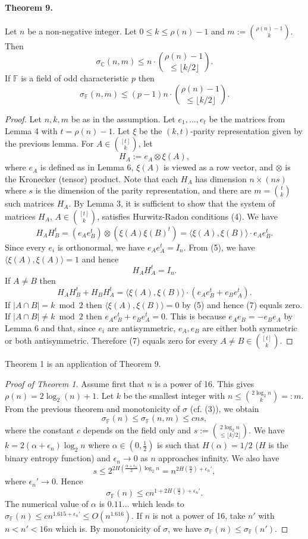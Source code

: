 \paragraph{Theorem 9.} Let $n$ be a non-negative integer. Let $0\le k\le\rho(n)-1$ and $m:=\binom{\rho(n)-1}k$. Then
\[\sigma_{\mathbb C}(n,m)\le n\cdot\binom{\rho(n)-1}{\le\lfloor k/2\rfloor}.\]
If $\mathbb F$ is a field of odd characteristic $p$ then
\[\sigma_{\mathbb F}(n,m)\le(p-1)n\cdot\binom{\rho(n)-1}{\le\lfloor k/2\rfloor}.\]
\begin{proof}
Let $n,k,m$ be as in the assumption. Let $e_1,\ldots,e_t$ be the matrices from Lemma 4 with $t=\rho(n)-1$. Let $\xi$ be the $(k,t)$-parity representation given by the previous lemma. For $A\in\binom{[t]}k$, let
\[H_A:=e_A\otimes\xi(A),\]
where $e_A$ is defined as in Lemma 6, $\xi(A)$ is viewed as a row vector, and $\otimes$ is the Kronecker (tensor) product.
Note that each $H_A$ has dimension $n\times(ns)$ where $s$ is the dimension of the parity representation, and there are $m=\binom tk$ such matrices $H_A$. By Lemma 3, it is sufficient to show that the system of matrices $H_A$, $A\in\binom{[t]}k$, satisfies Hurwitz-Radon conditions (4).
We have
\[H_AH_B^t=(e_Ae_B^t)\otimes(\xi(A)\xi(B)^t)=\langle\xi(A),\xi(B)\rangle\cdot e_Ae_B^t.\]
Since every $e_i$ is orthonormal, we have $e_Ae_A^t=I_n$. From (5), we have $\langle\xi(A),\xi(A)\rangle=1$ and hence
\[H_AH_A^t=I_n.\]
If $A\ne B$ then
\begin{equation}
H_AH_B^t+H_BH_A^t=\langle\xi(A),\xi(B)\rangle\cdot(e_Ae_B^t+e_Be_A^t).\tag{7}
\end{equation}
If $|A\cap B|=k\bmod2$ then $\langle\xi(A),\xi(B)\rangle=0$ by (5) and hence (7) equals zero. If $|A\cap B|\ne k\bmod2$ then $e_Ae_B^t+e_Be_A^t=0$. This is because $e_Ae_B=-e_Be_A$ by Lemma 6 and that, since $e_i$ are antisymmetric, $e_A,e_B$ are either both symmetric or both antisymmetric. Therefore (7) equals zero for every $A\ne B\in\binom{[t]}k$.
\end{proof}
Theorem 1 is an application of Theorem 9.
\begin{proof}[Proof of Theorem 1]
Assume first that $n$ is a power of 16. This gives $\rho(n)=2\log_2(n)+1$. Let $k$ be the smallest integer with $n\le\binom{2\log_2n}k=:m$. From the previous theorem and monotonicity of $\sigma$ (cf. (3)), we obtain
\[\sigma_{\mathbb F}(n)\le\sigma_{\mathbb F}(n,m)\le cns,\]
where the constant $c$ depends on the field only and $s:=\binom{2\log_2n}{\le\lfloor k/2\rfloor}$.
We have $k=2(\alpha+\epsilon_n)\log_2n$ where $\alpha\in(0,\frac12)$ is such that $H(\alpha)=1/2$ ($H$ is the binary entropy function) and $\epsilon_n\to0$ as $n$ approaches infinity. We also have
\[s\le2^{2H(\frac{\alpha+\epsilon_n}{2})\log_2n}=n^{2H(\frac\alpha2)+\epsilon_n'},\]
where $\epsilon_n'\to0$. Hence
\[\sigma_{\mathbb F}(n)\le cn^{1+2H(\frac\alpha2)+\epsilon_n'}.\]
The numerical value of $\alpha$ is $0.11\ldots$ which leads to $\sigma_{\mathbb F}(n)\le cn^{1.615+\epsilon_n'}\le O(n^{1.616})$.
If $n$ is not a power of 16, take $n'$ with $n<n'<16n$ which is. By monotonicity of $\sigma$, we have $\sigma_{\mathbb F}(n)\le\sigma_{\mathbb F}(n')$.
\end{proof}
